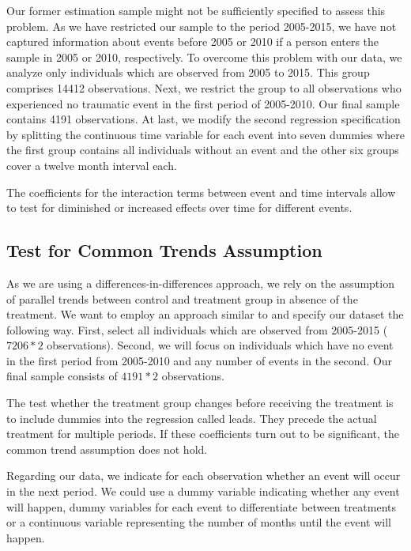 \documentclass[12pt, a4paper, fleqn, parskip]{scrartcl}
\begin{document}
Our former estimation sample might not be sufficiently specified to assess this
problem. As we have restricted our sample to the period 2005-2015, we have not
captured information about events before 2005 or 2010 if a person enters the
sample in 2005 or 2010, respectively. To overcome this problem with our data,
we analyze only individuals which are observed from 2005 to 2015. This group
comprises 14412 observations. Next, we restrict the group to all observations
who experienced no traumatic event in the first period of 2005-2010. Our final
sample contains 4191 observations. At last, we modify the second regression
specification by splitting the continuous time variable for each event into
seven dummies where the first group contains all individuals without an event
and the other six groups cover a twelve month interval each.

The coefficients for the interaction terms between event and time intervals
allow to test for diminished or increased effects over time for different
events.


\subsection{Test for Common Trends Assumption} %
\label{sub:test_for_common_trends_assumption}

As we are using a differences-in-differences approach, we rely on the
assumption of parallel trends between control and treatment group in absence of
the treatment. We want to employ an approach similar to \citet{autor2003} and
specify our dataset the following way. First, select all individuals which are
observed from 2005-2015 ($7206 * 2$ observations). Second, we will focus on
individuals which have no event in the first period from 2005-2010 and any
number of events in the second. Our final sample consists of $4191 * 2$
observations.

The test whether the treatment group changes before receiving the treatment is
to include dummies into the regression called leads. They precede the actual
treatment for multiple periods. If these coefficients turn out to be
significant, the common trend assumption does not hold.

Regarding our data, we indicate for each observation whether an event will
occur in the next period. We could use a dummy variable indicating whether any
event will happen, dummy variables for each event to differentiate between
treatments or a continuous variable representing the number of months until the
event will happen.
\end{document}
